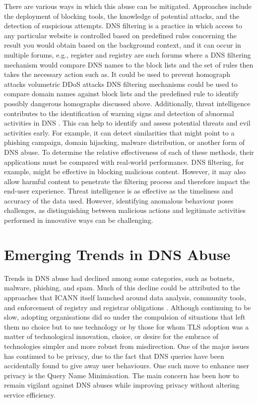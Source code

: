 There are various ways in which this abuse can be mitigated. Approaches include the deployment of blocking tools, the knowledge of potential attacks, and the detection of suspicious attempts. DNS filtering is a practice in which access to any particular website is controlled based on predefined rules concerning the result you would obtain based on the background context, and it can occur in multiple forums, e.g., register and registry are such forums where a DNS filtering mechanism would compare DNS names to the block lists and the set of rules then takes the necessary action such as. It could be used to prevent homograph attacks volumetric DDoS attacks DNS filtering mechanisms could be used to compare domain names against block lists and the predefined rule to identify possibly dangerous homographs discussed above. Additionally, threat intelligence contributes to the identification of warning signs and detection of abnormal activities in DNS \cite{rizvi2022application}. This can help to identify and assess potential threats and evil activities early. For example, it can detect similarities that might point to a phishing campaign, domain hijacking, malware distribution, or another form of DNS abuse. To determine the relative effectiveness of each of these methods, their applications must be compared with real-world performance. DNS filtering, for example, might be effective in blocking malicious content. However, it may also allow harmful content to penetrate the filtering process and therefore impact the end-user experience. Threat intelligence is as effective as the timeliness and accuracy of the data used. However, identifying anomalous behaviour poses challenges, as distinguishing between malicious actions and legitimate activities performed in innovative ways can be challenging.



\section{Emerging Trends in DNS Abuse}

Trends in DNS abuse had declined among some categories, such as botnets, malware, phishing, and spam. Much of this decline could be attributed to the approaches that ICANN itself launched around data analysis, community tools, and enforcement of registry and registrar obligations \cite{icann_dns_security_threat}. Although continuing to be slow, adopting organisations did so under the compulsion of situations that left them no choice but to use technology or by those for whom TLS adoption was a matter of technological innovation, choice, or desire for the embrace of technologies simpler and more robust from misdirection. One of the major issues has continued to be privacy, due to the fact that DNS queries have been accidentally found to give away user behaviours. One such move to enhance user privacy is the Query Name Minimisation. The main concern has been how to remain vigilant against DNS abuses while improving privacy without altering service efficiency.

